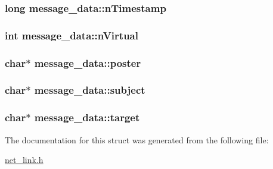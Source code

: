 \hypertarget{structmessage__data_a309b3b979bba01f3d1ed02c748181b89}{
\subsubsection[{n\-Timestamp}]{\setlength{\rightskip}{0pt plus 5cm}long message\-\_\-data\-::n\-Timestamp}}\label{structmessage__data_a309b3b979bba01f3d1ed02c748181b89}
\hypertarget{structmessage__data_af515291944b6a6bca2691f17011a4912}{
\subsubsection[{n\-Virtual}]{\setlength{\rightskip}{0pt plus 5cm}int message\-\_\-data\-::n\-Virtual}}\label{structmessage__data_af515291944b6a6bca2691f17011a4912}
\hypertarget{structmessage__data_a8e32e1ef2badc1155fe33c86a7a589b9}{
\subsubsection[{poster}]{\setlength{\rightskip}{0pt plus 5cm}char$\ast$ message\-\_\-data\-::poster}}\label{structmessage__data_a8e32e1ef2badc1155fe33c86a7a589b9}
\hypertarget{structmessage__data_a69def671138afb7572f9a67d8c32a8d9}{
\subsubsection[{subject}]{\setlength{\rightskip}{0pt plus 5cm}char$\ast$ message\-\_\-data\-::subject}}\label{structmessage__data_a69def671138afb7572f9a67d8c32a8d9}
\hypertarget{structmessage__data_a8b1ac3a31472876aa85ec7dd759ba98e}{
\subsubsection[{target}]{\setlength{\rightskip}{0pt plus 5cm}char$\ast$ message\-\_\-data\-::target}}\label{structmessage__data_a8b1ac3a31472876aa85ec7dd759ba98e}


The documentation for this struct was generated from the following file\-:\begin{DoxyCompactItemize}
\item 
\hyperlink{net__link_8h}{net\-\_\-link.\-h}\end{DoxyCompactItemize}
